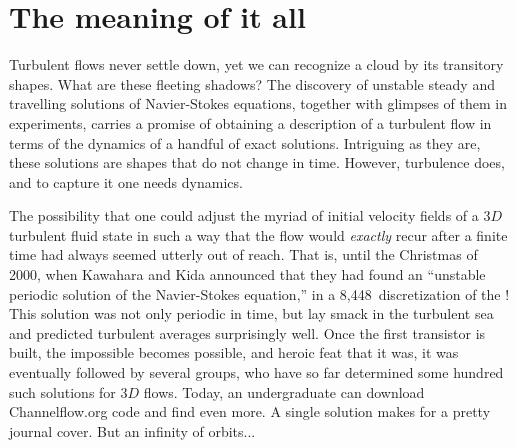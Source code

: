 

\chapter{The meaning of it all}
\label{c-marginal}

\newcommand{\turbulence}{shmurbulence}


Turbulent flows never settle down, yet we can recognize a cloud by its
transitory shapes. What are these fleeting shadows? The discovery of
unstable steady and travelling solutions of Navier-Stokes equations,
together with glimpses of them in experiments, carries a
promise of obtaining a description of a turbulent flow in terms of the
dynamics of a handful of exact solutions. Intriguing as they are, these
solutions are shapes that do not change in time. However, turbulence
does, and to capture it one needs dynamics.

The possibility that one could
adjust the myriad of initial velocity fields of a 3$D$ turbulent fluid
state in such a way that the flow would \emph{exactly} recur after a
finite time had always seemed utterly out of reach.
That is, until the Christmas of 2000, when Kawahara and Kida announced
that they had found an ``unstable periodic solution of the
Navier-Stokes equation,'' in a 8,448\dmn\ discretization of the \pCf!
This solution was not only periodic in time, but lay smack in the
turbulent sea and predicted turbulent averages surprisingly well.
Once the first transistor is built, the impossible becomes possible,
and heroic feat that it was, it was eventually followed by
several groups,
who have so far determined some hundred such solutions for 3$D$ flows.
Today, an undergraduate can download
 {Channelflow.org} code and find
even more. A single solution makes for a pretty journal cover. But
an infinity of orbits...

